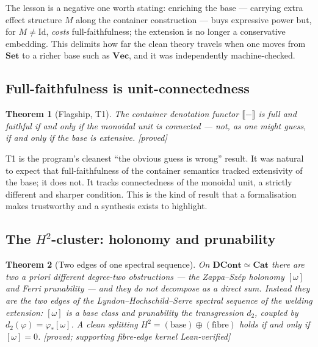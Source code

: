 \documentclass[11pt]{article}
\theoremstyle{plain}
\newtheorem{theorem}{Theorem}[section]
\theoremstyle{definition}
\theoremstyle{remark}
\newcommand{\DCont}{\mathbf{DCont}}
\newcommand{\Cat}{\mathbf{Cat}}
\newcommand{\Set}{\mathbf{Set}}
\renewcommand{\Vec}{\mathbf{Vec}}
\newcommand{\omegacl}{[\omega]}
\newcommand{\HH}[1]{H^{#1}}
\newcommand{\Id}{\mathrm{Id}}
\newcommand{\grade}[1]{{\small\textsf{[#1]}}}
\newcommand{\gProved}{\grade{proved}}
\begin{document}
The lesson is a negative one worth stating: enriching the base --- carrying extra effect
structure $M$ along the container construction --- buys expressive power but, for $M\neq
\Id$, \emph{costs} full-faithfulness; the extension is no longer a conservative embedding.
This delimits how far the clean theory travels when one moves from $\Set$ to a richer
base such as $\Vec$, and it was independently machine-checked.

\subsection{Full-faithfulness is unit-connectedness}\label{sec:t1}

\begin{theorem}[Flagship, T1]\label{thm:t1}
The container denotation functor $\llbracket-\rrbracket$ is full and faithful if and only
if the monoidal unit is \emph{connected} --- not, as one might guess, if and only if the
base is extensive. \gProved{}
\end{theorem}

T1 is the program's cleanest ``the obvious guess is wrong'' result. It was natural to
expect that full-faithfulness of the container semantics tracked extensivity of the base;
it does not. It tracks connectedness of the monoidal unit, a strictly different and
sharper condition. This is the kind of result that a formalisation makes trustworthy and a
synthesis exists to highlight.

\subsection{The $\HH{2}$-cluster: holonomy and prunability}\label{sec:cluster}

\begin{theorem}[Two edges of one spectral sequence]\label{thm:cluster}
On $\DCont \simeq \Cat$ there are two a priori different degree-two obstructions --- the
Zappa--Sz\'ep holonomy $\omegacl$ and Ferri \emph{prunability} --- and they do \emph{not}
decompose as a direct sum. Instead they are the two edges of the Lyndon--Hochschild--Serre
spectral sequence of the welding extension: $\omegacl$ is a base class and prunability the
transgression $d_2$, coupled by $d_2(\varphi) = \varphi_*\omegacl$. A clean splitting
$\HH{2} = (\text{base}) \oplus (\text{fibre})$ holds if and only if $\omegacl = 0$.
\grade{proved; supporting fibre-edge kernel Lean-verified}
\end{theorem}
\end{document}
